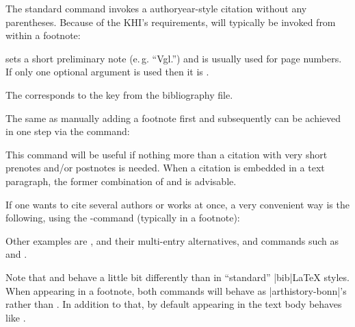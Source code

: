 \documentclass[a4paper,
10pt,
ngerman,
english
]{ltxdoc}
\begin{document}
\DescribeMacro{\cite}%
The standard  command invokes a authoryear-style citation without any parentheses. Because of the KHI's requirements,  will typically be invoked from within a footnote:

 sets a short preliminary note (e.\,g. \enquote{Vgl.}) and  is usually used for page numbers.
If only one optional argument is used then it is .
The  corresponds to the key from the bibliography file.

\DescribeMacro{\footcite}
The same as manually adding a footnote first and  subsequently can be achieved in one step via the  command:
This command will be useful if nothing more than a citation with very short prenotes and/or postnotes is needed. 
When a citation is embedded in a text paragraph, the former combination of  and  is advisable.

\DescribeMacro{\cites}
If one wants to cite several authors or works at once, a very convenient way is the following, using the -command (typically in a footnote):
Other examples are , and their multi-entry alternatives, and commands such as  and .

Note that  and  behave a little bit differently than in \enquote{standard} |bib|\LaTeX{} styles. 
When appearing in a footnote, both commands will behave as |arthistory-bonn|'s  rather than . 
In addition to that, by default  appearing in the text body behaves like .
\end{document}

